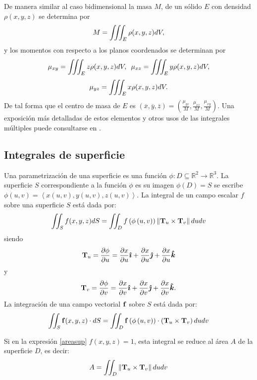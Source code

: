 De manera similar al caso bidimensional la masa $M$, de un sólido $E$ con densidad $\rho (x,y,z)$ se determina por
\[M=\displaystyle \iiint_E \rho (x,y,z) dV,\] y los momentos con respecto a los planos coordenados se determinan por
\[\displaystyle \mu_{xy}=\iiint_E z\rho(x,y,z) dV,\,\,\, \mu_{xz}=\iiint_E y\rho(x,y,z) dV,\]
\[\displaystyle  \mu_{yz}=\iiint_E x\rho(x,y,z)dV.\]
De tal forma que el centro de masa de $E$ es
$(\overline{x},\overline{y},\overline{z})= (\frac{\mu_{yz}}{M}, \frac{\mu_{xz}}{M},\frac{\mu_{xy}}{M}) $.
Una exposición más detalladas de estos elementos y otros usos de las integrales múltiples puede consultarse en \cite{thomas_calculo_2015}.
\subsection{Integrales de superficie}
Una parametrización de una superficie es una función
$\phi:D\subseteq \mathbb{R}^{2}\rightarrow \mathbb{R}^{3}$.
La superficie $S$ correspondiente a la
función $\phi $ es su imagen $\phi \left( D\right) =S$ se escribe
$\phi(u,v)=\left\langle x\left( u,v\right) ,y\left( u,v\right),z\left( u,v\right) \right\rangle $.
La integral de un campo escalar $f$ sobre una superficie $S$ está dada por:
\begin{equation} \label{areasup}
\iint_{S}f(x,y,z) dS=\iint_{D}f\left( \phi \left( u,v\right)
\right) \left\| {\bf T}_{u}\times {\bf T}_{v}\right\| dudv
\end{equation}
siendo
\[{\bf T}_{u}=\frac{\partial \phi }{\partial u}=\frac{\partial x}{\partial u}\boldsymbol{\hat{\imath}}+\frac{\partial x}{\partial u}\boldsymbol{\hat{\jmath}}+\frac{\partial x}{\partial u}\boldsymbol{\hat{k}}\]
y \[{\bf T}_{v}=\frac{\partial \phi }{\partial v}=\frac{\partial x}{\partial v}\boldsymbol{\hat{\imath}}+\frac{\partial x}{\partial v}\boldsymbol{\hat{\jmath}}+\frac{\partial x}{\partial v}\boldsymbol{\hat{k}}.\]
La integración de una campo vectorial ${\bf f}$ sobre $S$ está dada por:
\begin{equation}
\iint_{S} {\bf f}(x,y,z) \cdot dS=\iint_{D} {\bf f} \left( \phi \left(
u,v\right) \right) \cdot \left( {\bf T}_{u}\times {\bf T}_{v}\right) dudv
\end{equation}

Si en la expresión \ref{areasup} $f(x,y,z)=1$, esta integral se reduce al área $A$ de la superficie $D$, es decir:
\begin{equation}
A=\iint_{D} \left\| {\bf T}_{u}\times {\bf T}_{v}\right\| dudv \label{areasup2}
\end{equation}


